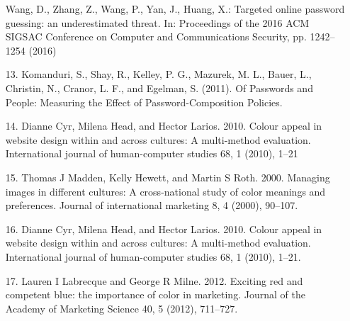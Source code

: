 \documentclass[5p,twocolumn]{elsarticle}
\begin{document}
\begin{enumerate}
Wang, D., Zhang, Z., Wang, P., Yan, J., Huang, X.: Targeted online password guessing: an underestimated threat. In: Proceedings of the 2016 ACM SIGSAC Conference on Computer and Communications Security, pp. 1242–1254 (2016)
\item [13.]
Komanduri, S., Shay, R., Kelley, P. G., Mazurek, M. L., Bauer, L., Christin, N., Cranor, L. F., and Egelman, S. (2011). Of Passwords and People: Measuring the Effect of Password-Composition Policies.
\item [14.] Dianne Cyr, Milena Head, and Hector Larios. 2010. Colour appeal in website design within and across cultures: A multi-method evaluation. International journal of human-computer studies 68, 1 (2010), 1–21		

\item [15.] Thomas J Madden, Kelly Hewett, and Martin S Roth. 2000. Managing images in different cultures: A cross-national study of color meanings and preferences. Journal of international marketing 8, 4 (2000), 90–107.	
				
\item [16.] Dianne Cyr, Milena Head, and Hector Larios. 2010. Colour appeal in website design within and across cultures: A multi-method evaluation. International journal of human-computer studies 68, 1 (2010), 1–21.

\item[17.] Lauren I Labrecque and George R Milne. 2012. Exciting red and competent blue: the importance of color in marketing. Journal of the Academy of Marketing Science 40, 5 (2012), 711–727.	 				
\end{enumerate}
\end{document}
